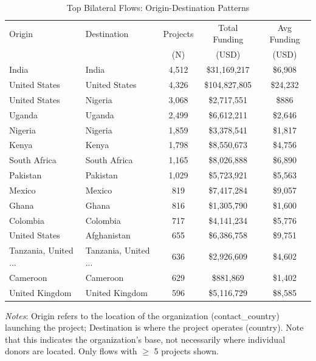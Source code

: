 \begin{table}[htbp]
\centering
\caption{Top Bilateral Flows: Origin-Destination Patterns}
\label{tab:bilateral_flows}
\begin{threeparttable}
\small
\begin{tabular}{llccc}
\toprule
Origin & Destination & Projects & Total Funding & Avg Funding \\
& & (N) & (USD) & (USD) \\
\midrule
India & India & 4,512 & \$31,169,217 & \$6,908 \\
United States & United States & 4,326 & \$104,827,805 & \$24,232 \\
United States & Nigeria & 3,068 & \$2,717,551 & \$886 \\
Uganda & Uganda & 2,499 & \$6,612,211 & \$2,646 \\
Nigeria & Nigeria & 1,859 & \$3,378,541 & \$1,817 \\
Kenya & Kenya & 1,798 & \$8,550,673 & \$4,756 \\
South Africa & South Africa & 1,165 & \$8,026,888 & \$6,890 \\
Pakistan & Pakistan & 1,029 & \$5,723,921 & \$5,563 \\
Mexico & Mexico & 819 & \$7,417,284 & \$9,057 \\
Ghana & Ghana & 816 & \$1,305,790 & \$1,600 \\
Colombia & Colombia & 717 & \$4,141,234 & \$5,776 \\
United States & Afghanistan & 655 & \$6,386,758 & \$9,751 \\
Tanzania, United ... & Tanzania, United ... & 636 & \$2,926,609 & \$4,602 \\
Cameroon & Cameroon & 629 & \$881,869 & \$1,402 \\
United Kingdom & United Kingdom & 596 & \$5,116,729 & \$8,585 \\
\bottomrule
\end{tabular}
\begin{tablenotes}
\small
\item \textit{Notes}: Origin refers to the location of the organization (contact\_country) launching the project; Destination is where the project operates (country). Note that this indicates the organization's base, not necessarily where individual donors are located. Only flows with $\geq$ 5 projects shown.
\end{tablenotes}
\end{threeparttable}
\end{table}

